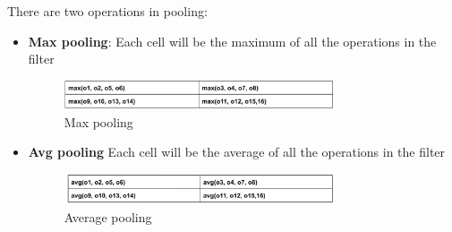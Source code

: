 \documentclass[11pt, twosides]{article}
\begin{document}
There are two operations in pooling:
\begin{itemize}
    
    \item\textbf{Max pooling}: Each cell will be the maximum of all the operations in the filter
    
\begin{figure}[h]
    \centering
    \includegraphics[width=8cm]{max.png}
    \caption{Max pooling}
    \label{fig:galaxy}
\end{figure}

    \item \textbf{Avg pooling} Each cell will be the average of all the operations in the filter
    
\begin{figure}[h]
            \centering
            \includegraphics[width=8cm]{avg.png}
            \caption{Average pooling}
\end{figure}
\end{itemize}    

\end{document}
